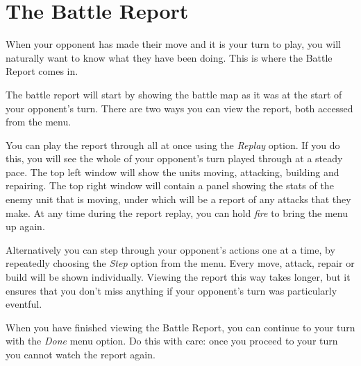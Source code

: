 %
%
%

\chapter{The Battle Report}

\noindent
When your opponent has made their move and it is your turn to play, you will naturally want to know what they have been doing. This is where the Battle Report comes in.

The battle report will start by showing the battle map as it was at the start of your opponent's turn. There are two ways you can view the report, both accessed from the menu.

You can play the report through all at once using the {\it Replay} option. If you do this, you will see the whole of your opponent's turn played through at a steady pace. The top left window will show the units moving, attacking, building and repairing. The top right window will contain a panel showing the stats of the enemy unit that is moving, under which will be a report of any attacks that they make. At any time during the report replay, you can hold {\it fire} to bring the menu up again.

Alternatively you can step through your opponent's actions one at a time, by repeatedly choosing the {\it Step} option from the menu. Every move, attack, repair or build will be shown individually. Viewing the report this way takes longer, but it ensures that you don't miss anything if your opponent's turn was particularly eventful.

When you have finished viewing the Battle Report, you can continue to your turn with the {\it Done} menu option. Do this with care: once you proceed to your turn you cannot watch the report again.
